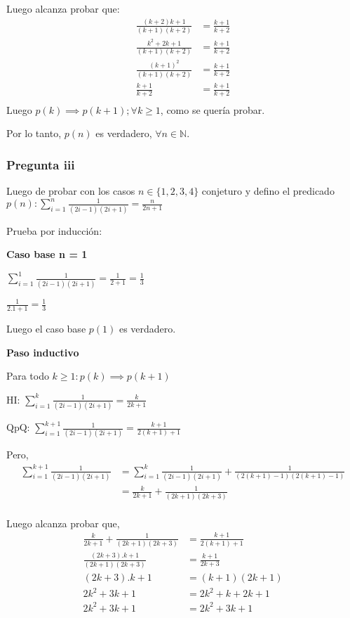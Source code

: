 Luego alcanza probar que:
\begin{align*}
    \frac{(k+2)k + 1}{(k+1)(k+2)} &= \frac{k+1}{k+2} \\
    \frac{k^2 + 2k + 1}{(k+1)(k+2)} &= \frac{k+1}{k+2} \\
    \frac{(k+1)^2}{(k+1)(k+2)} &= \frac{k+1}{k+2} \\
    \frac{k+1}{k+2} &= \frac{k+1}{k+2} \\
\end{align*}
Luego $p(k) \implies p(k+1); \forall k \geq 1$, como se quería probar.

Por lo tanto, $p(n)$ es verdadero, $\forall n \in \mathbb{N}$.

\subsubsection{Pregunta iii}

Luego de probar con los casos $n \in \{ 1,2,3,4 \}$ conjeturo y defino el predicado $p(n): \sum_{i=1}^{n}\frac{1}{(2i-1)(2i+1)} = \frac{n}{2n+1}$

Prueba por inducción:

\textbf{Caso base n = 1}

$ \sum_{i=1}^{1}\frac{1}{(2i-1)(2i+1)} = \frac{1}{2+1} = \frac{1}{3}$

$ \frac{1}{2.1+1} = \frac{1}{3}$

Luego el caso base $p(1)$ es verdadero.

\textbf{Paso inductivo}

Para todo $k \geq 1: p(k) \implies p(k+1)$

HI: $\sum_{i=1}^{k}\frac{1}{(2i-1)(2i+1)} = \frac{k}{2k+1}$

QpQ: $\sum_{i=1}^{k+1}\frac{1}{(2i-1)(2i+1)} = \frac{k+1}{2(k+1)+1}$

Pero,
\begin{align*}
    \sum_{i=1}^{k+1}\frac{1}{(2i-1)(2i+1)} &= \sum_{i=1}^{k}\frac{1}{(2i-1)(2i+1)} + \frac{1}{(2(k+1)-1)(2(k+1)-1)} \\
    &= \frac{k}{2k+1} + \frac{1}{(2k+1)(2k+3)} \\
\end{align*}

Luego alcanza probar que,
\begin{align*}
    \frac{k}{2k+1} + \frac{1}{(2k+1)(2k+3)} &= \frac{k+1}{2(k+1)+1} \\
    \frac{(2k+3).k + 1}{(2k+1)(2k+3)} &= \frac{k+1}{2k+3} \\
    (2k+3).k + 1 &= (k+1)(2k+1) \\
    2k^2 + 3k + 1 &= 2k^2 + k + 2k +1 \\
    2k^2 + 3k + 1 &= 2k^2 + 3k +1 \\
\end{align*}

